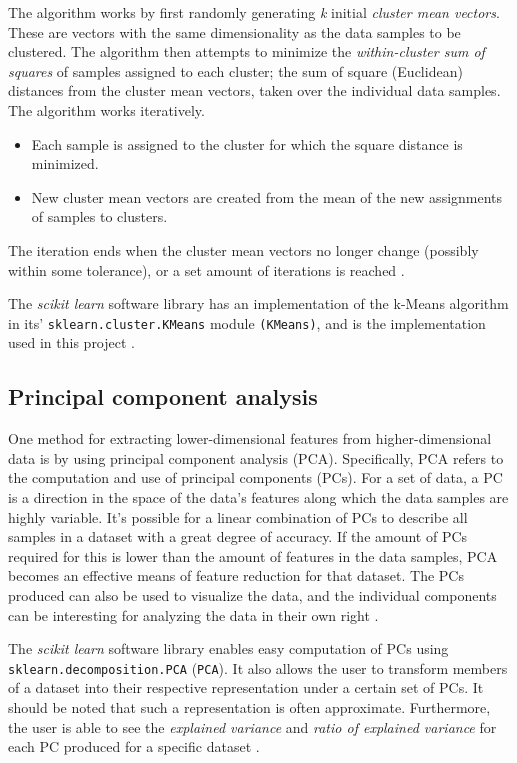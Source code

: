\documentclass{article}
\begin{document}
The algorithm works by first randomly generating \textit{k} initial \textit{cluster mean vectors}. 
These are vectors with the same dimensionality as the data samples to be clustered. 
The algorithm then attempts to minimize the \textit{within-cluster sum of squares} of samples assigned to each cluster; the sum of square (Euclidean) distances from the cluster mean vectors, taken over the individual data samples.
The algorithm works iteratively. 
\begin{itemize}
    \item Each sample is assigned to the cluster for which the square distance is minimized.
    \item New cluster mean vectors are created from the mean of the new assignments of samples to clusters.
\end{itemize}
The iteration ends when the cluster mean vectors no longer change (possibly within some tolerance), or a set amount of iterations is reached \citep[p258-260]{PractStats}.

The \textit{scikit learn} software library has an implementation of the k-Means algorithm in its' \texttt{sklearn.cluster.KMeans} module \texttt{(KMeans)}, and is the implementation used in this project \citep{SKLEARN}.

\subsection{Principal component analysis}\label{PCA BG}

One method for extracting lower-dimensional features from higher-dimensional data is by using principal component analysis (PCA).
Specifically, PCA refers to the computation and use of principal components (PCs).
For a set of data, a PC is a direction in the space of the data's features along which the data samples are highly variable.
It's possible for a linear combination of PCs to describe all samples in a dataset with a great degree of accuracy.
If the amount of PCs required for this is lower than the amount of features in the data samples, PCA becomes an effective means of feature reduction for that dataset.
The PCs produced can also be used to visualize the data, and the individual components can be interesting for analyzing the data in their own right \citep[p374-380]{ISLR}.

The \textit{scikit learn} software library enables easy computation of PCs using \texttt{sklearn.decomposition.PCA} (\texttt{PCA}).
It also allows the user to transform members of a dataset into their respective representation under a certain set of PCs. 
It should be noted that such a representation is often approximate.
Furthermore, the user is able to see the \textit{explained variance} and \textit{ratio of explained variance} for each PC produced for a specific dataset \citep{SKLEARN}.
\end{document}
